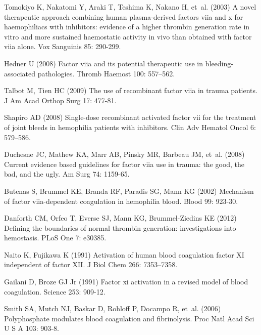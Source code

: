 \documentclass[processes,article,received,moreauthors,pdftex,12pt,a4paper]{mdpi}
\begin{document}
\begin{thebibliography}{9999}
Tomokiyo K, Nakatomi Y, Araki T, Teshima K, Nakano H, et~al. (2003) A novel
  therapeutic approach combining human plasma-derived factors viia and x for
  haemophiliacs with inhibitors: evidence of a higher thrombin generation rate
  in vitro and more sustained haemostatic activity in vivo than obtained with
  factor viia alone.
\newblock Vox Sanguinis 85: 290-299.

Hedner U (2008) Factor viia and its potential therapeutic use in
  bleeding-associated pathologies.
\newblock Thromb Haemost 100: 557--562.

Talbot M, Tien HC (2009) The use of recombinant factor viia in trauma patients.
\newblock J Am Acad Orthop Surg 17: 477-81.

Shapiro AD (2008) Single-dose recombinant activated factor vii for the
  treatment of joint bleeds in hemophilia patients with inhibitors.
\newblock Clin Adv Hematol Oncol 6: 579--586.

Duchesne JC, Mathew KA, Marr AB, Pinsky MR, Barbeau JM, et~al. (2008) Current
  evidence based guidelines for factor viia use in trauma: the good, the bad,
  and the ugly.
\newblock Am Surg 74: 1159-65.

Butenas S, Brummel KE, Branda RF, Paradis SG, Mann KG (2002) Mechanism of
  factor viia-dependent coagulation in hemophilia blood.
\newblock Blood 99: 923-30.

Danforth CM, Orfeo T, Everse SJ, Mann KG, Brummel-Ziedins KE (2012) Defining
  the boundaries of normal thrombin generation: investigations into hemostasis.
\newblock PLoS One 7: e30385.

Naito K, Fujikawa K (1991) Activation of human blood coagulation factor {XI}
  independent of factor {XII}.
\newblock J Biol Chem 266: 7353--7358.

Gailani D, Broze GJ Jr (1991) Factor xi activation in a revised model of blood
  coagulation.
\newblock Science 253: 909-12.

Smith SA, Mutch NJ, Baskar D, Rohloff P, Docampo R, et~al. (2006) Polyphosphate
  modulates blood coagulation and fibrinolysis.
\newblock Proc Natl Acad Sci U S A 103: 903-8.


\end{thebibliography}
\end{document}
